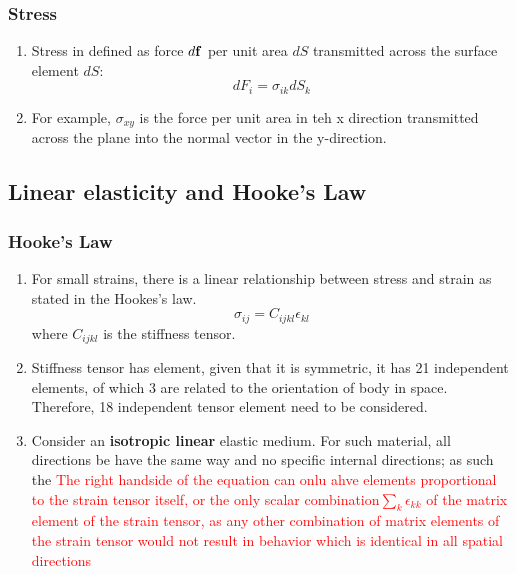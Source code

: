 \documentclass[12pt,a4paper]{article}
\begin{document}
    \subsubsection{Stress}
        \begin{enumerate}
            \item Stress in defined as force $d\vb{f}$ per unit area $dS$ transmitted across the surface element $dS$:
            $$
                dF_i=\sigma_{ik} dS_k
            $$
            \item For example, $\sigma_{xy}$ is the force per unit area in teh x direction transmitted across the plane into the normal vector in the y-direction.
        \end{enumerate}
\subsection{Linear elasticity and Hooke's Law}
    \subsubsection{Hooke's Law}
        \begin{enumerate}
            \item For small strains, there is a linear relationship between stress and strain as stated in the Hookes's law. 
            $$
                \sigma_{ij}=C_{ijkl}\epsilon_{kl}
            $$
            where $C_{ijkl}$ is the stiffness tensor.
            \item Stiffness tensor has element, given that it is symmetric, it has 21 independent elements, of which 3 are related to the orientation of body in space. Therefore, 18 independent tensor element need to be considered.
            \item Consider an \textbf{isotropic linear} elastic medium. For such material, all directions be have the same way and no specific internal directions; as such the \textcolor{red}{The right handside of the equation can onlu ahve elements proportional to the strain tensor itself, or the only scalar combination$\sum_{k}\epsilon_{kk}$ of the matrix element of the strain tensor, as any other combination of matrix elements of the strain tensor would not result in behavior which is identical in all spatial directions}
        \end{enumerate}
\end{document}
